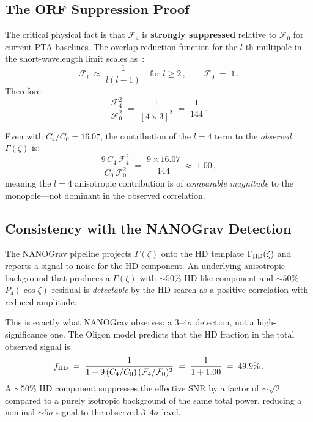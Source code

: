 \subsection{The ORF Suppression Proof}

The critical physical fact is that $\mathcal{F}_4$ is \textbf{strongly suppressed} relative to $\mathcal{F}_0$ for current PTA baselines.  The overlap reduction function for the $l$-th multipole in the short-wavelength limit scales as~\cite{Gair2014}:
\begin{equation}
    \mathcal{F}_l \;\approx\; \frac{1}{l(l-1)} \quad \text{for } l \geq 2\,,\qquad \mathcal{F}_0 \;=\; 1\,.
    \label{eq:orf_scaling}
\end{equation}
Therefore:
\begin{equation}
    \frac{\mathcal{F}_4^2}{\mathcal{F}_0^2} \;=\; \frac{1}{[4 \times 3]^2} \;=\; \frac{1}{144}\,.
    \label{eq:F4_suppression}
\end{equation}

Even with $C_4/C_0 = 16.07$, the contribution of the $l = 4$ term to the \emph{observed} $\Gamma(\zeta)$ is:
\begin{equation}
    \frac{9\, C_4\, \mathcal{F}_4^2}{C_0\, \mathcal{F}_0^2} \;=\; \frac{9 \times 16.07}{144} \;\approx\; 1.00\,,
    \label{eq:l4_observed}
\end{equation}
meaning the $l = 4$ anisotropic contribution is of \emph{comparable magnitude} to the monopole---not dominant in the observed correlation.

\subsection{Consistency with the NANOGrav Detection}

The NANOGrav pipeline projects $\Gamma(\zeta)$ onto the HD template $\Gamma_{\rm HD}(\zeta)$ and reports a signal-to-noise for the HD component.  An underlying anisotropic background that produces a $\Gamma(\zeta)$ with $\sim50\%$ HD-like component and $\sim50\%$ $P_4(\cos\zeta)$ residual is \emph{detectable} by the HD search as a positive correlation with reduced amplitude.

This is exactly what NANOGrav observes: a $3$--$4\sigma$ detection, not a high-significance one.  The Oligon model predicts that the HD fraction in the total observed signal is
\begin{equation}
    f_{\rm HD} \;=\; \frac{1}{1 + 9\, (C_4/C_0)\, (\mathcal{F}_4/\mathcal{F}_0)^2} \;=\; \frac{1}{1 + 1.00} \;=\; 49.9\%\,.
    \label{eq:hd_fraction}
\end{equation}
A $\sim50\%$ HD component suppresses the effective SNR by a factor of $\sim\!\sqrt{2}$ compared to a purely isotropic background of the same total power, reducing a nominal $\sim\!5\sigma$ signal to the observed $3$--$4\sigma$ level.

